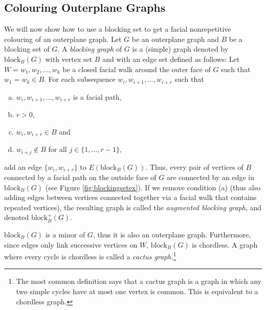 \documentclass{patmorin}
\newcommand{\block}{\mathrm{block}}
\begin{document}
\subsection{Colouring Outerplane Graphs}
We will now show how to use a blocking set to get a facial nonrepetitive colouring of an outerplane graph. Let $G$ be an outerplane graph and $B$ be a blocking set of $G$. A \emph{blocking graph} of $G$ is a (simple) graph denoted by $\block_{B}(G)$ with vertex set $B$ and with an edge set defined as follows: Let $W=w_1,w_2,\ldots,w_k$ be a closed facial walk around the outer face of $G$ such that $w_1=w_k\in B$. For each subsequence $w_i,w_{i+1},\ldots,w_{i+r}$ such that 
\begin{enumerate}[a)]
 \item $w_i,w_{i+1},\ldots,w_{i+r}$ is a facial path,
 \item $r>0$,
 \item $w_i,w_{i+r}\in B$ and
 \item $w_{i+j}\notin B$ for all $j \in \{1, \ldots, r-1\}$,
\end{enumerate}
add an edge $\{w_i, w_{i+r}\}$ to $E(\block_{B}(G))$. 
Thus, every pair of vertices of $B$ connected by a facial path on the outside face of $G$ are connected by an edge in $\block_{B}(G)$ (see Figure \ref{fig:blockingsetex}). If we remove condition (a) (thus also adding edges between vertices connected together via a facial walk that contains repeated vertices), the resulting graph is called the \emph{augmented blocking graph}, and denoted $\block_{B}^+(G)$.

$\block_{B}(G)$ is a minor of $G$, thus it is also an outerplane graph. Furthermore, since edges only link successive vertices on $W$, $\block_{B}(G)$ is chordless. A graph where every cycle is chordless is called a \emph{cactus graph}.\footnote{The most common definition says that a cactus graph is a graph in which any two simple cycles have at most one vertex is common. This is equivalent to a chordless graph.}
\end{document}
